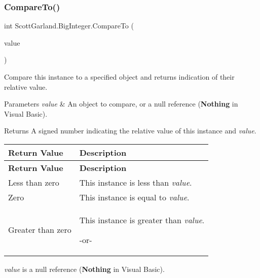 \subsubsection{\texorpdfstring{Compare\+To()}{CompareTo()}}
{\footnotesize\ttfamily int Scott\+Garland.\+Big\+Integer.\+Compare\+To (\begin{DoxyParamCaption}\item[{\hyperlink{class_scott_garland_1_1_big_integer}{Big\+Integer}}]{value }\end{DoxyParamCaption})\hspace{0.3cm}{\ttfamily [inline]}}



Compare this instance to a specified object and returns indication of their relative value. 


\begin{DoxyParams}{Parameters}
{\em value} & An object to compare, or a null reference ({\bfseries Nothing} in Visual Basic).\\
\hline
\end{DoxyParams}
\begin{DoxyReturn}{Returns}
A signed number indicating the relative value of this instance and {\itshape value}. \tabulinesep=1mm
\begin{longtabu} spread 0pt [c]{*{2}{|X[-1]}|}
\hline
\rowcolor{\tableheadbgcolor}\textbf{ Return Value }&\textbf{ Description  }\\
\endfirsthead
\hline
\endfoot
\hline
\rowcolor{\tableheadbgcolor}\textbf{ Return Value }&\textbf{ Description  }\\
\endhead
Less than zero &This instance is less than {\itshape value}.  \\
Zero &This instance is equal to {\itshape value}.  \\
Greater than zero &This instance is greater than {\itshape value}. 

-\/or-\/\\
\end{longtabu}

\end{DoxyReturn}
{\itshape value} is a null reference ({\bfseries Nothing} in Visual Basic).   \mbox{\label{class_scott_garland_1_1_big_integer_affa766b6b0b77a333971307b90a66aa0}} 
